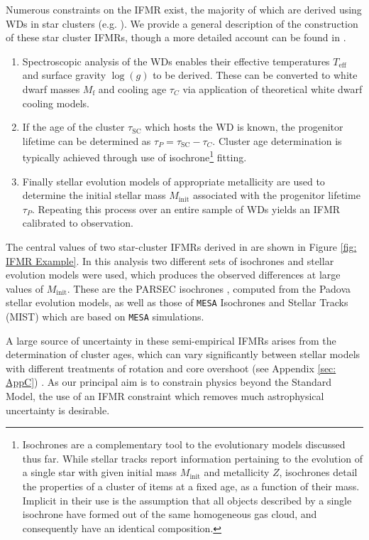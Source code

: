 Numerous constraints on the IFMR exist, the majority of which are derived using WDs in star clusters (e.g. \cite{Catalan2008, Kalirai_2008, Salaris_2009, Cummings_2018}). We provide a general description of the construction of these star cluster IFMRs, though a more detailed account can be found in \cite{Cummings_2018}.
\begin{enumerate}
    \item Spectroscopic analysis of the WDs enables their effective temperatures $T_{\mathrm{eff}}$ and surface gravity $\log(g)$ to be derived. These can be converted to white dwarf masses $M_{\mathrm{f}}$ and cooling age $\tau_C$ via application of theoretical white dwarf cooling models.
    \item If the age of the cluster $\tau_{\mathrm{SC}}$ which hosts the WD  is known, the progenitor lifetime can be determined as $\tau_{P}=\tau_{\mathrm{SC}}-\tau_{C}$. Cluster age determination is typically achieved through use of isochrone\footnote{ Isochrones are a complementary tool to the evolutionary models discussed thus far. While stellar tracks report information pertaining to the evolution of a single star with given initial mass \(M_{\textrm{init}}\) and metallicity $Z$, isochrones detail the properties of a cluster of items at a fixed age, as a function of their mass. Implicit in their use is the assumption that all objects described by a single isochrone have formed out of the same homogeneous gas cloud, and consequently have an identical composition.} fitting.
    \item Finally stellar evolution models of appropriate metallicity are used to determine the initial stellar mass $M_{\mathrm{init}}$ associated with the progenitor lifetime $\tau_P$. Repeating this process over an entire sample of WDs yields an IFMR calibrated to observation.
\end{enumerate}
The central values of two star-cluster IFMRs derived in \cite{Cummings_2018} are shown in Figure \ref{fig: IFMR Example}. In this analysis two different sets of isochrones and stellar evolution models were used, which produces the observed differences at large values of $M_{\mathrm{init}}$. These are the PARSEC isochrones \cite{ParsecIsochrones}, computed from the Padova stellar evolution models, as well as those of \texttt{MESA} Isochrones and Stellar Tracks (MIST) \cite{MIST0, MIST1} which are based on \texttt{MESA} simulations.



A large source of uncertainty in these semi-empirical IFMRs arises from the determination of cluster ages, which can vary significantly between stellar models with different treatments of rotation and core overshoot (see Appendix \ref{sec: AppC}) \cite{Andrews}. As our principal aim is to constrain physics beyond the Standard Model, the use of an IFMR constraint which removes much astrophysical uncertainty is desirable.


